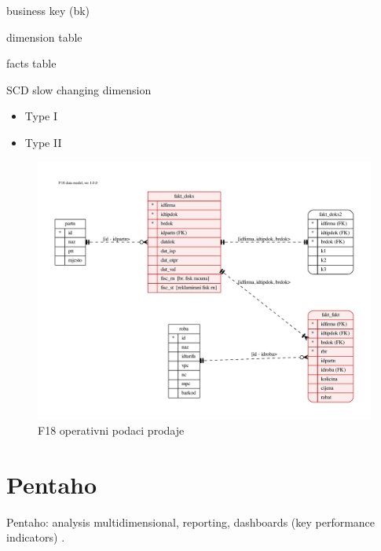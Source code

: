 \documentclass[times, utf8, seminar]{fit}
\begin{document}
business key (bk)

dimension table

facts table

SCD slow changing dimension
\begin{itemize}
  \item Type I
  \item Type II
\end{itemize}

\begin{figure}
\centering
\includegraphics[width=15cm]{img/F18_db.pdf}
\caption{F18 operativni podaci prodaje}
\end{figure}

\section{Pentaho}

Pentaho: analysis multidimensional, reporting, dashboards (key performance indicators) \cite[str.~7]{pentaho32}.
\end{document}
